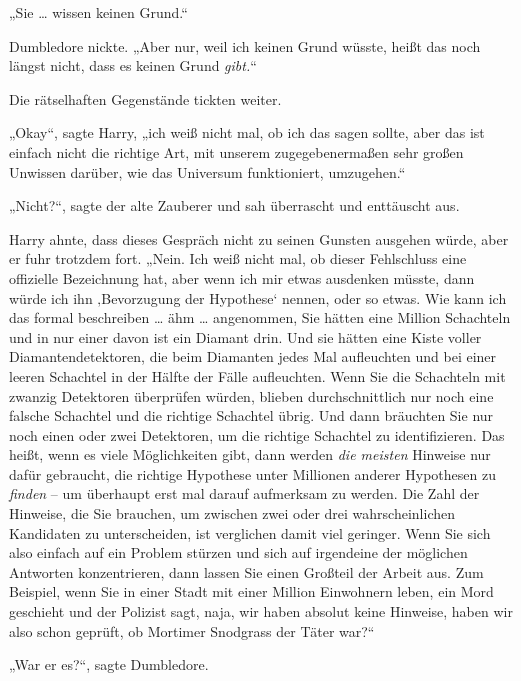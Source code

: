 {„Sie … wissen keinen Grund.“

Dumbledore nickte. „Aber nur, weil ich keinen Grund wüsste, heißt das noch längst nicht, dass es keinen Grund \emph{gibt.}“

Die rätselhaften Gegenstände tickten weiter.

„Okay“, sagte Harry, „ich weiß nicht mal, ob ich das sagen sollte, aber das ist einfach nicht die richtige Art, mit unserem zugegebenermaßen sehr großen Unwissen darüber, wie das Universum funktioniert, umzugehen.“

„Nicht?“, sagte der alte Zauberer und sah überrascht und enttäuscht aus.

Harry ahnte, dass dieses Gespräch nicht zu seinen Gunsten ausgehen würde, aber er fuhr trotzdem fort. „Nein. Ich weiß nicht mal, ob dieser Fehlschluss eine offizielle Bezeichnung hat, aber wenn ich mir etwas ausdenken müsste, dann würde ich ihn ‚Bevorzugung der Hypothese` nennen, oder so etwas. Wie kann ich das formal beschreiben … ähm … angenommen, Sie hätten eine Million Schachteln und in nur einer davon ist ein Diamant drin. Und sie hätten eine Kiste voller Diamantendetektoren, die beim Diamanten jedes Mal aufleuchten und bei einer leeren Schachtel in der Hälfte der Fälle aufleuchten. Wenn Sie die Schachteln mit zwanzig Detektoren überprüfen würden, blieben durchschnittlich nur noch eine falsche Schachtel und die richtige Schachtel übrig. Und dann bräuchten Sie nur noch einen oder zwei Detektoren, um die richtige Schachtel zu identifizieren. Das heißt, wenn es viele Möglichkeiten gibt, dann werden \emph{die meisten} Hinweise nur dafür gebraucht, die richtige Hypothese unter Millionen anderer Hypothesen zu \emph{finden} -- um überhaupt erst mal darauf aufmerksam zu werden. Die Zahl der Hinweise, die Sie brauchen, um zwischen zwei oder drei wahrscheinlichen Kandidaten zu unterscheiden, ist verglichen damit viel geringer. Wenn Sie sich also einfach auf ein Problem stürzen und sich auf irgendeine der möglichen Antworten konzentrieren, dann lassen Sie einen Großteil der Arbeit aus. Zum Beispiel, wenn Sie in einer Stadt mit einer Million Einwohnern leben, ein Mord geschieht und der Polizist sagt, naja, wir haben absolut keine Hinweise, haben wir also schon geprüft, ob Mortimer Snodgrass der Täter war?“

„War er es?“, sagte Dumbledore.

}
